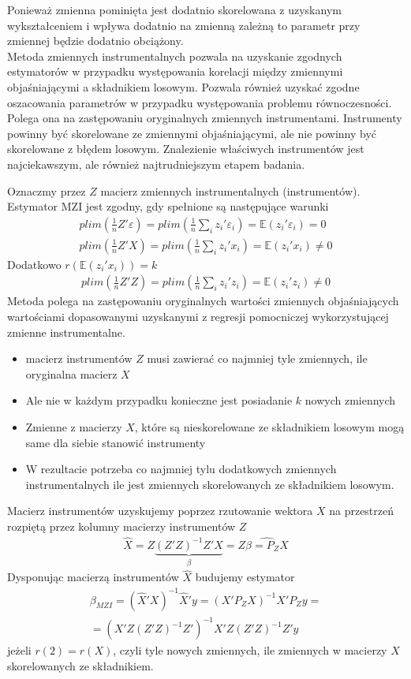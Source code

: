 Ponieważ zmienna pominięta jest dodatnio skorelowana z uzyskanym wykształceniem i wpływa dodatnio na zmienną zależną to parametr przy zmiennej będzie dodatnio obciążony.\\
Metoda zmiennych instrumentalnych pozwala na uzyskanie zgodnych estymatorów w przypadku występowania korelacji między zmiennymi objaśniającymi a składnikiem losowym. Pozwala również uzyskać zgodne oszacowania parametrów w przypadku występowania problemu równoczesności. Polega ona na zastępowaniu oryginalnych zmiennych instrumentami. Instrumenty powinny być skorelowane ze zmiennymi objaśniającymi, ale nie powinny być skorelowane z błędem losowym. Znalezienie właściwych instrumentów jest najciekawszym, ale również najtrudniejszym etapem badania.

Oznaczmy przez $ Z $ macierz zmiennych instrumentalnych (instrumentów). Estymator MZI jest zgodny, gdy spełnione są następujące warunki
\begin{gather*}
plim\left(\tfrac{1}{n}Z'\varepsilon\right)=plim\left(\tfrac{1}{n}\sum_iz_i'\varepsilon_i\right)=\mathbb E \left(z_i'\varepsilon_i\right)=0\\
plim\left(\tfrac{1}{n}Z'X\right)=plim\left(\tfrac{1}{n}\sum_iz_i'x_i\right)=\mathbb E \left(z_i'x_i\right)\neq0
\end{gather*}
Dodatkowo $ r\left(\mathbb E \left(z_i'x_i\right)\right) =k$
\begin{gather*}
plim\left(\tfrac{1}{n}Z'Z\right)=plim\left(\tfrac{1}{n}\sum_iz_i'z_i\right)=\mathbb E \left(z_i'z_i\right)\neq0
\end{gather*}
Metoda polega na zastępowaniu oryginalnych wartości zmiennych objaśniających wartościami dopasowanymi uzyskanymi z regresji pomocniczej wykorzystującej zmienne instrumentalne.
\begin{itemize}
	\item macierz instrumentów $ Z $ musi zawierać co najmniej tyle zmiennych, ile oryginalna macierz $ X $
	\item Ale nie w każdym przypadku konieczne jest posiadanie $ k $ nowych zmiennych
	\item Zmienne z macierzy $ X $, które są nieskorelowane ze składnikiem losowym mogą same dla siebie stanowić instrumenty
	\item W rezultacie potrzeba co najmniej tylu dodatkowych zmiennych instrumentalnych ile jest zmiennych skorelowanych ze składnikiem losowym.
\end{itemize}
Macierz instrumentów uzyskujemy poprzez rzutowanie wektora $ X $ na przestrzeń rozpiętą przez kolumny macierzy instrumentów $ Z $
\begin{gather*}
\hat{X}=Z\underset{\beta}{\underbrace{\left(Z'Z\right)^{-1}Z'X}}=Z\hat{\beta=P_ZX}
\end{gather*}
Dysponując macierzą instrumentów $ \hat X $ budujemy estymator
\begin{gather*}
\beta_{MZI}=\left(\hat X'X\right)^{-1}\hat X'y=\left(X'P_ZX\right)^{-1}X'P_Zy=\\=
\left(X'Z\left(Z'Z\right)^{-1}Z'\right)^{-1}X'Z\left(Z'Z\right)^{-1}Z'y
\end{gather*}
jeżeli $ r(2)=r(X)$, czyli tyle nowych zmiennych, ile zmiennych w macierzy $ X $ skorelowanych ze składnikiem.


